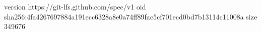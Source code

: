 version https://git-lfs.github.com/spec/v1
oid sha256:4fa4267697884a191ecc6328a8e0a74ff89fac5cf701ecd0bd7b13114c11008a
size 349676
